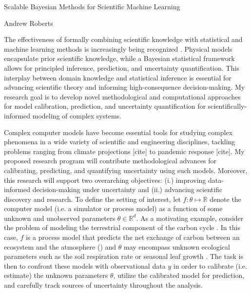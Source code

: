 \documentclass[12pt]{article}
\newcommand{\R}{\mathcal{R}}
\def\R{\mathbb{R}}
\begin{document}
\begin{center}
Scalable Bayesian Methods for Scientific Machine Learning
\end{center}

\begin{flushright}
Andrew Roberts
\end{flushright} 

The effectiveness of formally combining scientific knowledge with statistical and machine learning methods is increasingly being recognized \cite{Willcox}. Physical models
encapsulate prior scientific knowledge, while a Bayesian statistical framework allows for principled inference, prediction, and uncertainty quantification. This interplay between domain 
knowledge and statistical inference is essential for advancing scientific theory and informing high-consequence decision-making. My research goal is to develop novel methodological 
and computational approaches for model calibration, prediction, and uncertainty quantification for scientifically-informed modeling of complex systems. 

Complex computer models have become essential tools for studying complex phenomena in a wide variety of scientific and engineering disciplines, 
tackling problems ranging from climate projections [cite] to pandemic response [cite]. My proposed research program will contribute methodological 
advances for calibrating, predicting, and quantifying uncertainty using such models. Moreover, this research will support two 
overarching objectives: (i.) improving data-informed decision-making under uncertainty and (ii.) advancing scientific discovery and research. To define the 
setting of interest, let $f: \theta \mapsto \R$ denote the computer model (i.e. a simulator or process model) as a function of some unknown and unobserved
parameters $\theta \in \R^d$. As a motivating example, consider the problem of modeling the terrestrial component of the carbon cycle \cite{Friedlingstein}. 
In this case, $f$ is a process model that predicts the net exchange of carbon between an ecosystem and the atmosphere (\cite{Waring}) and $\theta$ may encompass 
unknown ecological parameters such as the soil respiration rate or seasonal leaf growth \cite{Fer}. The task is then to confront these models with observational data $y$ in 
order to calibrate (i.e. estimate) the unknown parameters $\theta$, utilize the calibrated model for prediction, and carefully track sources of uncertainty throughout the analysis. 
\end{document}
